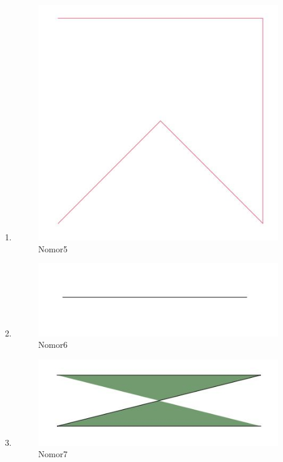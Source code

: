 \begin{enumerate}
			\item 
				
				\begin{figure}[H]
					\includegraphics[width=12cm]{figures/1174043/5.jpg}
					\centering
					\caption{Nomor5}
				\end{figure}
			
			\item 
				
				\begin{figure}[H]
					\includegraphics[width=12cm]{figures/1174043/6.jpg}
					\centering
					\caption{Nomor6}
				\end{figure}
			
			\item 
				
				\begin{figure}[H]
					\includegraphics[width=12cm]{figures/1174043/7.jpg}
					\centering
					\caption{Nomor7}
				\end{figure}
			

\end{enumerate}
